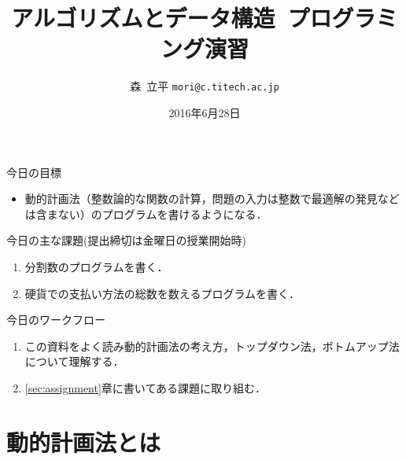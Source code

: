 \documentclass[a4paper,twoside,onecolumn,openany,article]{memoir}
\title{アルゴリズムとデータ構造~プログラミング演習}
\date{2016年6月28日}
\author{森~立平 \texttt{mori@c.titech.ac.jp}}
\theoremstyle{remark}
\begin{document}
\maketitle

\noindent
今日の目標
\begin{itemize}
\item 動的計画法（整数論的な関数の計算，問題の入力は整数で最適解の発見などは含まない）のプログラムを書けるようになる．
\end{itemize}

\noindent
今日の主な課題(提出締切は金曜日の授業開始時)
\begin{enumerate}
\item 分割数のプログラムを書く．
\item 硬貨での支払い方法の総数を数えるプログラムを書く．
\end{enumerate}

\noindent
今日のワークフロー
\begin{enumerate}
\item この資料をよく読み動的計画法の考え方，トップダウン法，ボトムアップ法について理解する．
\item \ref{sec:assignment}章に書いてある課題に取り組む．
\end{enumerate}

\section{動的計画法とは}
\end{document}
